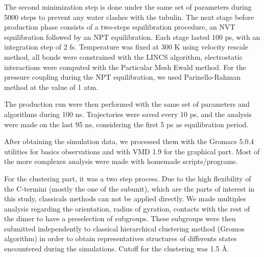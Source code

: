 \documentclass[a4paper]{article}
\begin{document}
The second minimization step is done under the same set of parameters during 5000 steps to prevent any water
clashes with the tubulin. The next stage before production phase consists of a two-steps equilibration procedure,
an NVT equilibration followed by an NPT equilibration. Each stage lasted 100 ps, with an integration step of 2 fs.
Temperature was fixed at 300 K using velocity rescale method, all bonds were constrained with the LINCS algorithm,
electrostatic interactions were computed with the Particular Mesh Ewald method. For the pressure coupling during
the NPT equilibration, we used Parinello-Rahman method at the value of 1 atm.

The production run were then performed with the same set of parameters and algorithms during 100 ns. Trajectories
were saved every 10 ps, and the analysis were made on the last 95 ns, considering the first 5 ps as equilibration
period.

After obtaining the simulation data, we processed them with the Gromacs 5.0.4 utilities for basics observations and
with VMD 1.9 for the graphical part. Most of the more complexes analysis were made with homemade scripts/programs.

For the clustering part, it was a two step process. Due to the high flexibility of the C-termini (mostly the one of
the \beta subunit), which are the parts of interest in this study, classicals methods can not be applied directly.
We made multiples analysis regarding the orientation, radius of gyration, contacts with the rest of the dimer to have
a preselection of subgroups. These subgroups were then submitted independently to classical hierarchical clustering
method (Gromos algorithm) in order to obtain representatives structures of differents states encountered during the
simulations. Cutoff for the clustering was 1.5 {\AA}.

\end{document}
